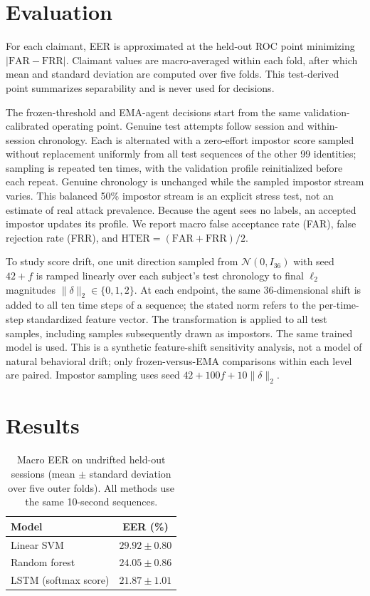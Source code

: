 \documentclass[3p,times,procedia]{elsarticle}
\begin{document}
\section{Evaluation}
\label{sec:evaluation}

For each claimant, EER is approximated at the held-out ROC point minimizing
$|\mathrm{FAR}-\mathrm{FRR}|$. Claimant values are macro-averaged within each
fold, after which mean and standard deviation are computed over five folds.
This test-derived point summarizes separability and is never used for decisions.

The frozen-threshold and EMA-agent decisions start from the same
validation-calibrated operating point. Genuine test attempts follow session and within-session
chronology. Each is alternated with a zero-effort impostor score sampled without
replacement uniformly from all test sequences of the other 99 identities;
sampling is repeated ten times, with the validation profile
reinitialized before each repeat. Genuine chronology is unchanged while the
sampled impostor stream varies. This balanced 50\% impostor stream is
an explicit stress test, not an estimate of real attack prevalence. Because the
agent sees no labels, an accepted impostor updates its profile. We report macro
false acceptance rate (FAR), false rejection rate (FRR), and
$\mathrm{HTER}=(\mathrm{FAR}+\mathrm{FRR})/2$.

To study score drift, one unit direction sampled from $\mathcal{N}(0,I_{36})$
with seed $42+f$ is ramped linearly over each subject's test chronology to final
$\ell_2$ magnitudes $\lVert\delta\rVert_2\in\{0,1,2\}$. At each endpoint, the
same 36-dimensional shift is added to all ten time steps of a sequence; the
stated norm refers to the per-time-step standardized feature vector. The
transformation is applied to all test samples, including samples subsequently
drawn as impostors. The same trained model is used. This is a synthetic
feature-shift sensitivity analysis, not a model of natural behavioral drift;
only frozen-versus-EMA comparisons within each level are paired. Impostor
sampling uses seed $42+100f+10\lVert\delta\rVert_2$.

\section{Results}
\label{sec:results}

\begin{table}[H]
\centering
\caption{Macro EER on undrifted held-out sessions (mean $\pm$ standard deviation
over five outer folds). All methods use the same 10-second sequences.}
\label{tab:clean}
\begin{tabular}{lc}
\toprule
Model & EER (\%) \\
\midrule
Linear SVM & $29.92\pm0.80$ \\
Random forest & $24.05\pm0.86$ \\
LSTM (softmax score) & $21.87\pm1.01$ \\
\bottomrule
\end{tabular}
\end{table}
\end{document}
